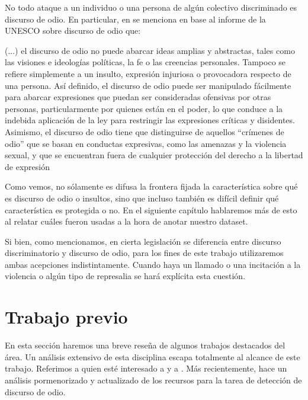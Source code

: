 No todo ataque a un individuo o una persona de algún colectivo discriminado es discurso de odio. En particular, en \citet{CIDH2015} se menciona en base al informe de la UNESCO sobre discurso de odio \citet{gagliardone2015countering} que:

\begin{displayquote}[]
    (...) el discurso de odio no puede abarcar ideas amplias y abstractas, tales como las visiones e ideologías políticas, la fe o las creencias personales. Tampoco se refiere simplemente a un insulto, expresión injuriosa o provocadora respecto de una persona. Así definido, el discurso de odio puede ser manipulado fácilmente para abarcar expresiones que puedan ser consideradas ofensivas por otras personas, particularmente por quienes están en el poder, lo que conduce a la indebida aplicación de la ley para restringir las expresiones críticas y disidentes. Asimismo, el discurso de odio tiene que distinguirse de aquellos “crímenes de odio” que se basan en conductas expresivas, como las amenazas y la violencia sexual, y que se encuentran fuera de cualquier protección del derecho a la libertad de expresión
\end{displayquote}

Como vemos, no sólamente es difusa la frontera fijada la característica sobre qué es discurso de odio o insultos, sino que incluso también es difícil definir qué característica es protegida o no. En el siguiente capítulo hablaremos más de esto al relatar cuáles fueron usadas a la hora de anotar nuestro dataset.

Si bien, como mencionamos, en cierta legislación se diferencia entre discurso discriminatorio y discurso de odio, para los fines de este trabajo utilizaremos ambas acepciones indistintamente. Cuando haya un llamado o una incitación a la violencia o algún tipo de represalia se hará explícita esta cuestión.


\section{Trabajo previo}

En esta sección haremos una breve reseña de algunos trabajos destacados del área. Un análisis extensivo de esta disciplina escapa totalmente al alcance de este trabajo. Referimos a quien esté interesado a \citet{schmidt2017survey} y a \citet{fortuna2018survey}. Más recientemente, \citet{poletto2021resources} hace un análisis pormenorizado y actualizado de los recursos para la tarea de detección de discurso de odio.

